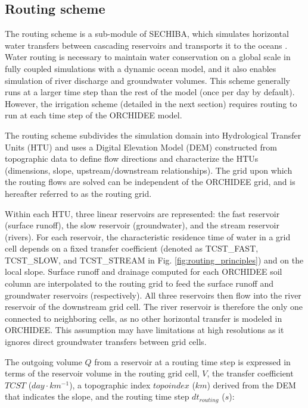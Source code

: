 
\subsection{Routing scheme}
The routing scheme is a sub-module of SECHIBA, which simulates horizontal water transfers between cascading reservoirs and transports it to the oceans \citep{ducharne_development_2003, ngo-duc_validation_2007}. 
Water routing is necessary to maintain water conservation on a global scale in fully coupled simulations with a dynamic ocean model, and it also enables simulation of river discharge and groundwater volumes. 
This scheme generally runs at a larger time step than the rest of the model (once per day by default). However, the irrigation scheme (detailed in the next section) requires routing to run at each time step of the ORCHIDEE model.

The routing scheme subdivides the simulation domain into Hydrological Transfer Units (HTU) and uses a Digital Elevation Model (DEM) constructed from topographic data to define flow directions and characterize the HTUs (dimensions, slope, upstream/downstream relationships). The grid upon which the routing flows are solved can be independent of the ORCHIDEE grid, and is hereafter referred to as the routing grid.

Within each HTU, three linear reservoirs are represented: the fast reservoir (surface runoff), the slow reservoir (groundwater), and the stream reservoir (rivers). For each reservoir, the characteristic residence time of water in a grid cell depends on a fixed transfer coefficient (denoted as TCST\_FAST, TCST\_SLOW, and TCST\_STREAM in Fig. \ref{fig:routing_principles}) and on the local slope.
Surface runoff and drainage computed for each ORCHIDEE soil column are interpolated to the routing grid to feed the surface runoff and groundwater reservoirs (respectively). All three reservoirs then flow into the river reservoir of the downstream grid cell. The river reservoir is therefore the only one connected to neighboring cells, as no other horizontal transfer is modeled in ORCHIDEE. This assumption may have limitations at high resolutions as it ignores direct groundwater transfers between grid cells.

The outgoing volume $Q$ from a reservoir at a routing time step is expressed in terms of the reservoir volume in the routing grid cell, $V$, the transfer coefficient $TCST$ ($day \cdot km^{-1}$), a topographic index $topoindex$ ($km$) derived from the DEM that indicates the slope, and the routing time step $dt_{routing}$ ($s$):

